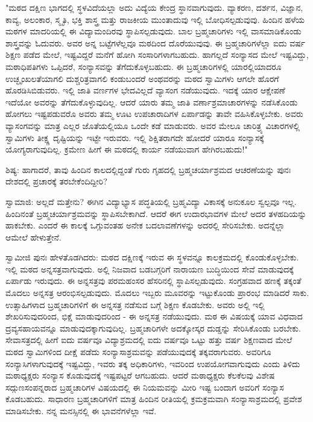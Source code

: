 "ಮಠದ ದಕ್ಷಿಣ ಭಾಗದಲ್ಲಿ ಸ್ಥಳವಿದೆಯಲ್ಲಾ ಅದು ವಿದ್ಯೆಯ ಕೇಂದ್ರ ಸ್ಥಾನವಾಗುವುದು. ವ್ಯಾಕರಣ, ದರ್ಶನ, ವಿಜ್ಞಾನ, ಕಾವ್ಯ, ಅಲಂಕಾರ, ಸ್ಮೃತಿ, ಭಕ್ತಿ ಶಾಸ್ತ್ರ ಮತ್ತು ರಾಜಕೀಯ ಮುಂತಾದುವು ಇಲ್ಲಿ ಬೋಧಿಸಲ್ಪಡುವುವು. ಹಿಂದಿನ ಹಳೆಯ ಮಠಗಳ ಮಾದರಿಯಲ್ಲಿ ಈ ವಿದ್ಯಾಮಂದಿರವು ಸ್ಥಾಪಿಸಲ್ಪಡುವುದು. ಬಾಲ ಬ್ರಹ್ಮಚಾರಿಗಳು ಇಲ್ಲಿ ವಾಸಮಾಡಿಕೊಂಡು ಶಾಸ್ತ್ರವನ್ನು ಓದುವರು. ಅವರ ಅನ್ನ ಬಟ್ಟೆಗಳೆಲ್ಲವೂ ಮಠದಿಂದ ದೊರೆಯುವುವು. ಈ ಬ್ರಹ್ಮಚಾರಿಗಳೆಲ್ಲಾ ಐದು ವರ್ಷ ಶಿಕ್ಷಣ ಪಡೆದ ಮೇಲೆ, ಇಷ್ಟವಿದ್ದರೆ ಮನೆಗೆ ಹೋಗಿ ಸಂಸಾರಿಗಳಾಗಬಹುದು. ಹಾಗಲ್ಲದೆ ಸಂನ್ಯಾಸದ ಮೇಲೆ ಇಷ್ಟವಿದ್ದು, ಮಠಾಧಿಪತಿಗಳು ಒಪ್ಪಿದರೆ, ಸಂನ್ಯಾಸವನ್ನು ತೆಗೆದುಕೊಳ್ಳಬಹುದು. ಈ ಬ್ರಹ್ಮಚಾರಿಗಳಲ್ಲಿ ಯಾರಲ್ಲಿಯಾದರೂ ಉಚ್ಛೃಂಖಲತೆಯಾಗಲಿ ದುಶ್ಚರಿತ್ರವಾಗಲಿ ಕಂಡುಬಂದರೆ ಅಂಥವರನ್ನು ಮಠದ ಸ್ವಾಮಿಗಳು ಆಗಲೇ ಹೊರಗೆ ಹೊರಡಿಸಿಬಿಡುವರು. ಇಲ್ಲಿ ಜಾತಿ ವರ್ಣಗಳ ಭೇದವಿಲ್ಲದೆ ವ್ಯಾಸಂಗ ನಡೆಯುವುದು. ಇದಕ್ಕೆ ಯಾರ ಆಕ್ಷೇಪಣೆ ಇದೆಯೋ ಅವರನ್ನು ತೆಗೆದುಕೊಳ್ಳುವುದಿಲ್ಲ. ಆದರೆ ಯಾರು ತಮ್ಮ ಜಾತಿ ವರ್ಣಾಶ್ರಮಾಚಾರಗಳನ್ನು ನಡೆಸಿಕೊಂಡು ಹೋಗಲು ಇಷ್ಟಪಡುವರೊ ಅವರು ತಮ್ಮ ಊಟ ಉಪಚಾರಾದಿಗಳ ಏರ್ಪಾಡನ್ನು ತಾವೇ ವಹಿಸಿಕೊಳ್ಳಬೇಕು. ಅವರು ವ್ಯಾಸಂಗವನ್ನು ಮಾತ್ರ ಎಲ್ಲರ ಜೊತೆಯಲ್ಲಿಯೂ ಒಂದೇ ಕಡೆ ಮಾಡುವರು. ಅವರ ಮೇಲೂ ಚಾರಿತ್ರ್ಯ ವಿಚಾರಗಳಲ್ಲಿ ಸ್ವಾಮಿಗಳು ತೀಕ್ಷ್ಣ ದೃಷ್ಟಿಯನ್ನು ಇಟ್ಟೇ ಇರುವರು. ಇಲ್ಲಿ ಶಿಕ್ಷಿತರಾಗದೇ ಹೋದರೆ ಯಾರೂ ಸಂನ್ಯಾಸಕ್ಕೆ ಯೋಗ್ಯರಾಗುವುದಿಲ್ಲ. ಕ್ರಮೇಣ ಹೀಗೆ ಈ ಮಠದಲ್ಲಿ ಕಾರ್ಯ ನಡೆಯುವಾಗ ಹೇಗಿರಬಹುದು!"

ಶಿಷ್ಯ: ಹಾಗಾದರೆ, ತಾವು ಹಿಂದಿನ ಕಾಲದಲ್ಲಿದ್ದಂತೆ ಗುರು ಗೃಹದಲ್ಲಿ ಬ್ರಹ್ಮಚರ್ಯಾಶ್ರಮದ ಆಚರಣೆಯನ್ನು ಪುನಃ ದೇಶದಲ್ಲಿ ಪ್ರಚಾರಕ್ಕೆ ತರಬೇಕೆಂದಿದ್ದೀರಿ?

ಸ್ವಾಮಾಜಿ: ಅಲ್ಲದೆ ಮತ್ತೇನು? ಈಗಿನ ವಿದ್ಯಾಭ್ಯಾಸ ಪದ್ಧತಿಯಲ್ಲಿ ಬ್ರಹ್ಮವಿದ್ಯಾ ವಿಕಾಸಕ್ಕೆ ಅನುಕೂಲ ಸ್ವಲ್ಪವೂ ಇಲ್ಲ. ಹಿಂದಿನಂತೆ ಬ್ರಹ್ಮಚರ್ಯಾಶ್ರಮವನ್ನು ಸ್ಥಾಪಿಸಬೇಕಾಗಿದೆ. ಆದರೆ ಈಗ ಉದಾರಭಾವಗಳ ಮೇಲೆ ಅದರ ತಳಹದಿಯನ್ನು ಹಾಕಬೇಕು. ಎಂದರೆ ಈ ಕಾಲಕ್ಕೆ ಒಗ್ಗುವಂತಹ ಅನೇಕ ಬದಲಾವಣೆಗಳನ್ನು ಅದರಲ್ಲಿ ಸೇರಿಸಬೇಕು. ಅದನ್ನೆಲ್ಲಾ ಆಮೇಲೆ ಹೇಳುತ್ತೇನೆ.

ಸ್ವಾಮೀಜಿ ಪುನಃ ಹೇಳತೊಡಗಿದರು: ಮಠದ ದಕ್ಷಿಣಕ್ಕೆ ಇರುವ ಈ ಸ್ಥಳವನ್ನೂ ಕಾಲಕ್ರಮದಲ್ಲಿ ಕೊಂಡುಕೊಳ್ಳಬೇಕು. ಇಲ್ಲಿ ಮಠದ ಅನ್ನಸತ್ರವಾಗುವುದು. ಅಲ್ಲಿ ನಿಜವಾದ ಬಡಬಗ್ಗರಿಗೆ ನಾರಾಯಣ ಬುದ್ಧಿಯಿಂದ ಸೇವೆ ಮಾಡುವುದಕ್ಕೆ ಏರ್ಪಾಡು ಇರುವುದು. ಈ ಅನ್ನಸತ್ರವು ಪರಮಹಂಸರ ಹೆಸರಿನಲ್ಲಿ ಸ್ಥಾಪಿಸಲ್ಪಡುವುದು. ಸಂಗ್ರಹವಾದ ಹಣಕ್ಕೆ ತಕ್ಕಂತೆ ಮೊದಲು ಅನ್ನಸತ್ರ ಆರಂಭಿಸಲ್ಪಡುವುದು. ಮೊದಲು ಇಬ್ಬರು ಮೂವರನ್ನು ಇಟ್ಟುಕೊಂಡು ಪ್ರಾರಂಭ ಮಾಡಿದರೆ ಸಾಕು. ಉತ್ಸಾಹಿಗಳಾದ ಬ್ರಹ್ಮಚಾರಿಗಳಿಗೆ ಈ ಅನ್ನಸತ್ರ ನಡೆಸುವ ಬಗ್ಗೆ ಶಿಕ್ಷಣ ಕೊಡಬೇಕು. ಅವರು ಅಲ್ಲಿ ಇಲ್ಲಿ ಶೇಖರಿಸುವುದರಿಂದ, ಭಿಕ್ಷೆ ಮಾಡುವುದರಿಂದ - ಈ ಅನ್ನಸತ್ರ ನಡೆಯುವುದು. ಮಠ ಈ ವಿಷಯಕ್ಕೆ ಯಾವ ವಿಧವಾದ ದ್ರವ್ಯಸಹಾಯವನ್ನೂ ಮಾಡುವುದಕ್ಕಾಗುವುದಿಲ್ಲ. ಬ್ರಹ್ಮಚಾರಿಗಳೇ ಅದಕ್ಕೋಸ್ಕರ ದುಡ್ಡನ್ನು ಸೇರಿಸಿಕೊಂಡು ಬರಬೇಕು. ಸೇವಾಸತ್ರದಲ್ಲಿ ಹೀಗೆ ಐದು ವರ್ಷವೂ ವಿದ್ಯಾಶ್ರಮದಲ್ಲಿ ಐದು ವರ್ಷವೂ ಒಟ್ಟು ಹತ್ತು ವರ್ಷ ಶಿಕ್ಷಣವಾದ ಮೇಲೆ ಮಠದ ಸ್ವಾಮಿಗಳಿಂದ ದೀಕ್ಷೆ ಪಡೆದು ಸಂನ್ಯಾಸಾಶ್ರಮವನ್ನು ಪಡೆಯುವುದಕ್ಕೆ ತಕ್ಕವರಾಗುವರು. ಅವರಿಗೂ ಸಂನ್ಯಾಸಿಗಳಾಗುವುದಕ್ಕೆ ಇಷ್ಟವಿದ್ದು, ಇವರು ತಕ್ಕ ಅಧಿಕಾರಿಗಳು, ಇವರಿಂದ ಉಪಯೋಗವಾಗುವುದು ಎಂದು ತಿಳಿದು ಮಠಾಧ್ಯಕ್ಷರು ಸಂನ್ಯಾಸ ಕೊಡುವುದಕ್ಕೆ ಇಷ್ಟಪಟ್ಟರೆ ಆಗಬಹುದು. ಆದರೆ ಮಠಾಧ್ಯಕ್ಷರು ಕೆಲಕೆಲವು ವಿಶೇಷ ಸದ್ಗುಣಸಂಪನ್ನರಾದ ಬ್ರಹ್ಮಚಾರಿಗಳ ವಿಷಯದಲ್ಲಿ ಈ ನಿಯಮವನ್ನು ಮೀರಿ ಇಷ್ಟ ಬಂದಾಗ ಅವರಿಗೆ ಸಂನ್ಯಾಸ ಕೊಡಬಹುದು. ಸಾಧಾರಣ ಬ್ರಹ್ಮಚಾರಿಗಳಿಗೆ ಮಾತ್ರ ಹಿಂದಿನ ರೀತಿಯಲ್ಲಿ ಕ್ರಮಕ್ರಮವಾಗಿ ಸಂನ್ಯಾಸಾಶ್ರಮದಲ್ಲಿ ಪ್ರವೇಶ ಮಾಡಿಸಬೇಕು. ನನ್ನ ಮನಸ್ಸಿನಲ್ಲಿ ಈ ಭಾವನೆಗಳೆಲ್ಲಾ ಇವೆ.

